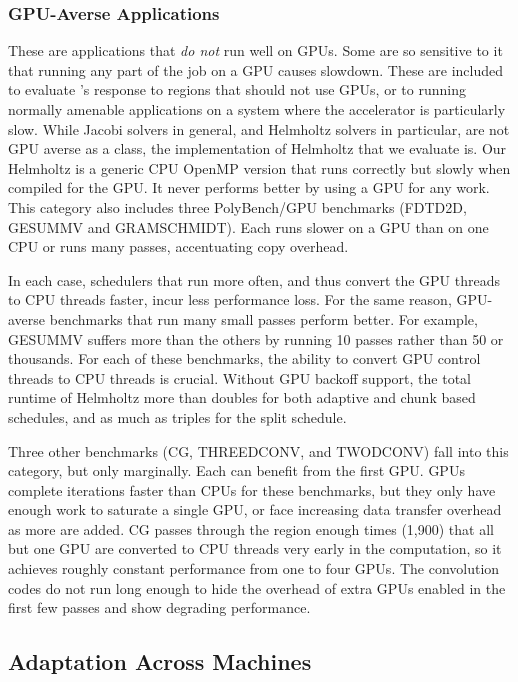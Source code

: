 \subsubsection{GPU-Averse Applications}

These are applications that \emph{do not} run well on GPUs. Some are so
sensitive to it that running any part of the job on a GPU causes slowdown.
These are included to evaluate \tsar's response to regions that should not use
GPUs, or to running normally amenable applications on a system where the
accelerator is particularly slow. While Jacobi solvers in general, and
Helmholtz solvers in particular, are not GPU averse as a class, the
implementation of Helmholtz that we evaluate is. Our Helmholtz is a generic
CPU OpenMP version that runs correctly but slowly when compiled for the GPU.
It never performs better by using a GPU for any work. This category
also includes three PolyBench/GPU benchmarks (FDTD2D, GESUMMV and
GRAMSCHMIDT).  Each runs slower on a GPU than on one CPU or runs many passes,
accentuating copy overhead.

In each case, schedulers that run more often, and thus convert the GPU threads
to CPU threads faster, incur less performance loss. For the same reason, GPU-averse
benchmarks that run many small passes perform better. For example, GESUMMV suffers
more than the others by running 10 passes rather than 50 or thousands.
For each of these benchmarks, the ability to convert GPU control threads to
CPU threads is crucial.  Without GPU backoff support, the total runtime of
Helmholtz more than doubles for both adaptive and chunk based schedules, and
as much as triples for the split schedule.

Three other benchmarks (CG, THREEDCONV, and TWODCONV) fall into this category,
but only marginally. Each can benefit from the first GPU. GPUs complete
iterations faster than CPUs for these benchmarks, but they only have enough
work to saturate a single GPU, or face increasing data transfer overhead as
more are added. CG passes through the region enough times (1,900) that all but one
GPU are converted to CPU threads very early in the computation, so it achieves
roughly constant performance from one to four GPUs. The convolution codes do
not run long enough to hide the overhead of extra GPUs enabled in the first
few passes and show degrading performance.

\subsection{Adaptation Across Machines}
\label{sec:multi}

